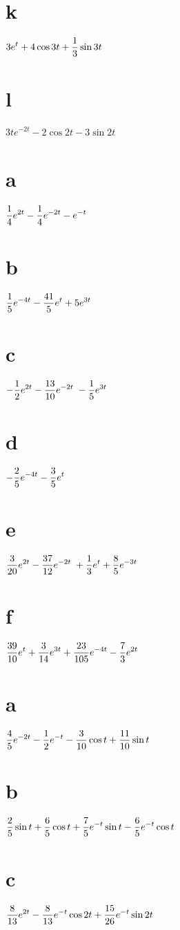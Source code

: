  \part{k} $\displaystyle{3e^t+4\cos 3t+\frac{1}{3}\sin 3t}$\;
\part{l} $3te^{-2t}-2\cos 2t-3\sin 2t$

\smallskip
{}
\part{a} $\displaystyle{\frac{1}{4}e^{2t}-
\frac{1}{4}e^{-2t}-e^{-t}}$\;
\part{b}  $\displaystyle{\frac{1}{5}e^{-4t}-\frac{41}{5}e^t+5e^{3t}}$\;
 \part{c} $\displaystyle{-\frac{1}{2}e^{2t}-\frac{13}{10}e^{-2t}\;
-\frac{1}{5}e^{3t}}$\;
\part{d}  $\displaystyle{-\frac{2}{5}e^{-4t}-\frac{3}{5}e^t}$\;
 \part{e}  $\displaystyle{\frac{3}{20}e^{2t}-\frac{37}{12}e^{-2t}\;
+\frac{1}{3}e^t+\frac{8}{5}e^{-3t}}$
\part{f} $\displaystyle{\frac{39}{10}e^t+\frac{3}{14}e^{3t}+\frac{23}{105}e^{-4t}
-\frac{7}{3} e^{2t}}$\;

\smallskip

\;   \part{a}  $\displaystyle{\frac{4}{5}e^{-2t}-\frac{1}{2}e^{-t}-\frac{3}{10}\cos t}
+\frac{11}{10}\sin t$\;
 \part{b}  $\displaystyle{\frac{2}{5}\sin t+\frac{6}{5}\cos t
+\frac{7}{5}e^{-t}\sin t-\frac{6}{5}e^{-t}\cos t}$
\part{c}
$\displaystyle{\frac{8}{13}e^{2t}-\frac{8}{13}e^{-t}\cos 2t+\frac{15}{26}
e^{-t}\sin 2t}$\;
